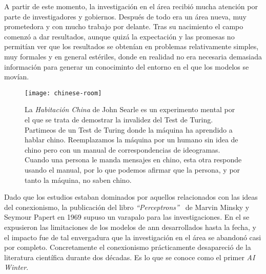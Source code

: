 A partir de este momento, la investigación en el área recibió mucha atención por parte de investigadores y gobiernos. Después de todo era un área nueva, muy prometedora y con mucho trabajo por delante. Tras su nacimiento el campo comenzó a dar resultados, aunque quizá la expectación y las promesas no permitían ver que los resultados se obtenían en problemas relativamente simples, muy formales y en general estériles, donde en realidad no era necesaria demasiada información para generar un conociminto del entorno en el que los modelos se movían.

\begin{figure*}
	\centering
	\texttt{[image: chinese-room]}
	\label{fig:chinese-room}
	\caption{La \textit{Habitación China} de John Searle es un experimento mental por el que se trata de demostrar la invalidez del Test de Turing. Partimeos de un Test de Turing donde la máquina ha aprendido a hablar chino. Reemplazamos la máquina por un humano sin idea de chino pero con un manual de correspondencias de ideogramas. Cuando una persona le manda mensajes en chino, esta otra responde usando el manual, por lo que podemos afirmar que la persona, y por tanto la máquina, no saben chino.}
\end{figure*}

Dado que los estudios estaban dominados por aquellos relacionados con las ideas del conexionismo, la publicación del libro \textit{\enquote{Perceptrons}}~\cite{minsky1969perceptrons} de Marvin Minsky y Seymour Papert en 1969 supuso un varapalo para las investigaciones. En el se expusieron las limitaciones de los modelos de \gls{ann} desarrollados hasta la fecha, y el impacto fue de tal envergadura que la investigación en el área se abandonó casi por completo. Concretamente el conexionismo prácticamente desapareció de la literatura científica durante dos décadas. Es lo que se conoce como el primer \textit{AI Winter}.

